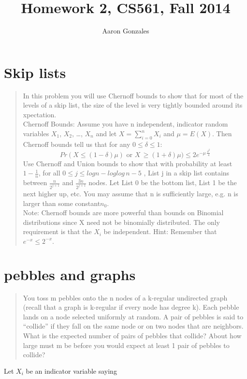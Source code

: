 \documentclass[titlepage]{article}\usepackage[]{graphicx}\usepackage[]{color}
\begin{document}
\title{Homework 2, CS561, Fall 2014}
\author{Aaron Gonzales}
\maketitle



\section{ Skip lists }
\begin{quote}
	In this problem you will use Chernoff bounds to show that for most of the levels
	of a skip list, the size of the level is very tightly bounded around its
	xpectation. \\
	Chernoff Bounds: Assume you have n independent, indicator random variables
	$X_1$,
	$X_2$, \dots, $X_n$ and let $X = \sum_{i=0}^n X_i $ and $\mu = E(X)$. Then Chernoff bounds tell us
	that for any $0 \leq \delta \leq 1$: \\
	\[ Pr(X \leq (1 - \delta)\mu)  \text{ or }  X \, \geq (1 + \delta)\mu) \leq 2e^{−\mu \, \frac{\delta^2}{4}} \]
	Use Chernoff and Union bounds to show that with probability at least
	$1 − \frac{1}{n}$, for
	all $ 0 \leq j \leq log n - log log\, n - 5$ , List j in a skip list contains
	between $\frac{n}{2^{j+1}}$ 
	and $ \frac{3n}{2^{j+1}}$  nodes. Let List 0 be the bottom list, List 1 be the next higher up,
	etc. You may assume that n is sufficiently large, e.g. n is larger than some
	constant$n_0$. \\
	Note: Chernoff bounds are more powerful than bounds on Binomial distributions
	since X need not be binomially distributed. The only requirement is that
	the $X_i$ be independent. Hint: Remember that $e^{−x} \leq 2^{−x}$.
\end{quote}





\section{pebbles and graphs}

\begin{quote}
	You toss m pebbles onto the n nodes of a k-regular undirected graph (recall
	that a graph is k-regular if every node has degree k). Each pebble lands on
	a node selected uniformly at random. A pair of pebbles is said to ``collide''
	if they fall on the same node or on two nodes that are neighbors. What is
	the expected number of pairs of pebbles that collide? About how large must
	m be before you would expect at least 1 pair of pebbles to collide?
\end{quote}
Let $X_i$ be an indicator variable saying 
\end{document}
